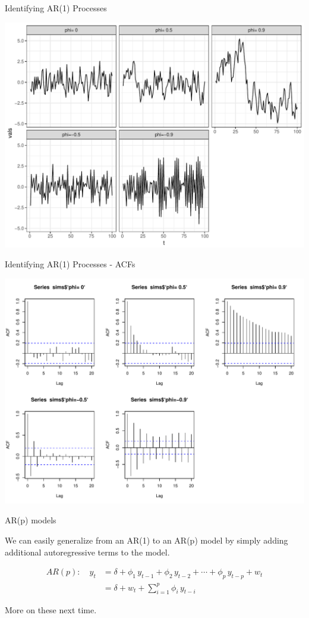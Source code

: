 \documentclass[11pt,ignorenonframetext,]{beamer}
\begin{document}
\begin{frame}{Identifying AR(1) Processes}

\includegraphics{Lec7_files/figure-beamer/unnamed-chunk-21-1.pdf}

\end{frame}

\begin{frame}{Identifying AR(1) Processes - ACFs}

\includegraphics{Lec7_files/figure-beamer/unnamed-chunk-22-1.pdf}

\end{frame}

\begin{frame}[t]{AR(p) models}

We can easily generalize from an AR(1) to an AR(p) model by simply
adding additional autoregressive terms to the model.

\[ 
\begin{aligned}
AR(p): \quad y_t 
  &= \delta + \phi_1 \, y_{t-1} + \phi_2 \, y_{t-2} + \cdots + \phi_p \, y_{t-p} + w_t  \\
  &= \delta + w_t + \sum_{i=1}^p \phi_i \, y_{t-i}
\end{aligned}
\]

More on these next time.

\end{frame}
\end{document}
